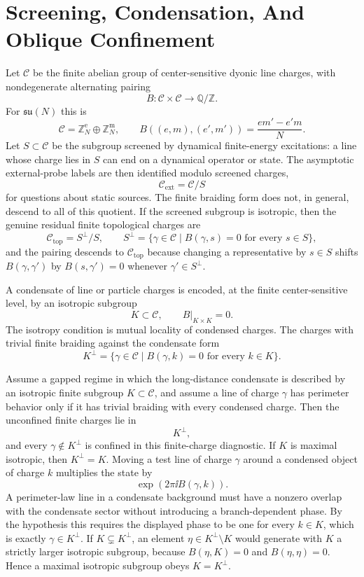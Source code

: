 \section{Screening, Condensation, And Oblique Confinement}

Let \(\mathcal C\) be the finite abelian group of center-sensitive dyonic line
charges, with nondegenerate alternating pairing
\[
  B:\mathcal C\times\mathcal C\longrightarrow\mathbb Q/\mathbb Z.
\]
For \(\mathfrak{su}(N)\) this is
\[
  \mathcal C=\mathbb Z_N^{\mathrm e}\oplus\mathbb Z_N^{\mathrm m},
  \qquad
  B((e,m),(e',m'))=\frac{em'-e'm}{N}.
\]
Let \(S\subset\mathcal C\) be the subgroup screened by dynamical finite-energy
excitations: a line whose charge lies in \(S\) can end on a dynamical
operator or state.  The asymptotic external-probe labels are then identified
modulo screened charges,
\[
  \mathcal C_{\mathrm{ext}}=\mathcal C/S
\]
for questions about static sources.  The finite braiding form does not, in
general, descend to all of this quotient.  If the screened subgroup is
isotropic, then the genuine residual finite topological charges are
\[
  \mathcal C_{\mathrm{top}}=S^\perp/S,\qquad
  S^\perp=\{\gamma\in\mathcal C\mid B(\gamma,s)=0
  \text{ for every }s\in S\},
\]
and the pairing descends to \(\mathcal C_{\mathrm{top}}\) because changing a
representative by \(s\in S\) shifts \(B(\gamma,\gamma')\) by
\(B(s,\gamma')=0\) whenever \(\gamma'\in S^\perp\).

A condensate of line or particle charges is encoded, at the finite
center-sensitive level, by an isotropic subgroup
\[
  K\subset\mathcal C,\qquad B|_{K\times K}=0.
\]
The isotropy condition is mutual locality of condensed charges.  The charges
with trivial finite braiding against the condensate form
\[
  K^\perp=\{\gamma\in\mathcal C\mid B(\gamma,k)=0
  \text{ for every }k\in K\}.
\]

Assume a gapped regime in which the long-distance condensate is described by
an isotropic finite subgroup \(K\subset\mathcal C\), and assume a line of
charge \(\gamma\) has perimeter behavior only if it has trivial braiding with
every condensed charge.  Then the unconfined finite charges lie in
\[
  K^\perp,
\]
and every \(\gamma\notin K^\perp\) is confined in this finite-charge
diagnostic.  If \(K\) is maximal isotropic, then \(K^\perp=K\).
Moving a test line of charge \(\gamma\) around a condensed object of charge
\(k\) multiplies the state by
\[
  \exp(2\pi\ii B(\gamma,k)).
\]
A perimeter-law line in a condensate background must have a nonzero overlap
with the condensate sector without introducing a branch-dependent phase.  By
the hypothesis this requires the displayed phase to be one for every
\(k\in K\), which is exactly \(\gamma\in K^\perp\).  If
\(K\subsetneq K^\perp\), an element \(\eta\in K^\perp\setminus K\) would
generate with \(K\) a strictly larger isotropic subgroup, because
\(B(\eta,K)=0\) and \(B(\eta,\eta)=0\).  Hence a maximal isotropic subgroup
obeys \(K=K^\perp\).

